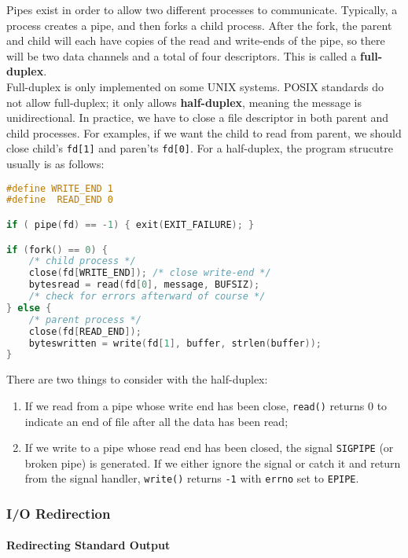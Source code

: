 \documentclass{article}
\newcommand{\bold}[1]{\textbf{#1}}
\newcommand{\code}[1]{\texttt{#1}}
\begin{document}
Pipes exist in order to allow two different processes to communicate. Typically, a process creates a pipe, and then forks a child process. After the fork, the parent and child will each have copies of the read and write-ends of the pipe, so there will be two data channels and a total of four descriptors. This is called a \bold{full-duplex}. \\ 

Full-duplex is only implemented on some UNIX systems. POSIX standards do not allow full-duplex; it only allows \bold{half-duplex}, meaning the message is unidirectional. In practice, we have to close a file descriptor in both parent and child processes. For examples, if we want the child to read from parent, we should close child's \code{fd[1]} and paren'ts \code{fd[0]}. For a half-duplex, the program strucutre usually is as follows:

\begin{lstlisting}[language=C]
#define WRITE_END 1
#define  READ_END 0

if ( pipe(fd) == -1) { exit(EXIT_FAILURE); }

if (fork() == 0) {
    /* child process */ 
    close(fd[WRITE_END]); /* close write-end */
    bytesread = read(fd[0], message, BUFSIZ);
    /* check for errors afterward of course */ 
} else {
    /* parent process */
    close(fd[READ_END]);
    byteswritten = write(fd[1], buffer, strlen(buffer));
}
\end{lstlisting}

There are two things to consider with the half-duplex:

\begin{enumerate}
    \item If we read from a pipe whose write end has been close, \code{read()} returns 0 to indicate an end of file after all the data has been read;
    \item If we write to a pipe whose read end has been closed, the signal \code{SIGPIPE} (or broken pipe) is generated. If we either ignore the signal or catch it and return from the signal handler, \code{write()} returns \code{-1} with \code{errno} set to \code{EPIPE}. 
\end{enumerate}

\subsubsection{I/O Redirection}

\paragraph{Redirecting Standard Output}
\end{document}
